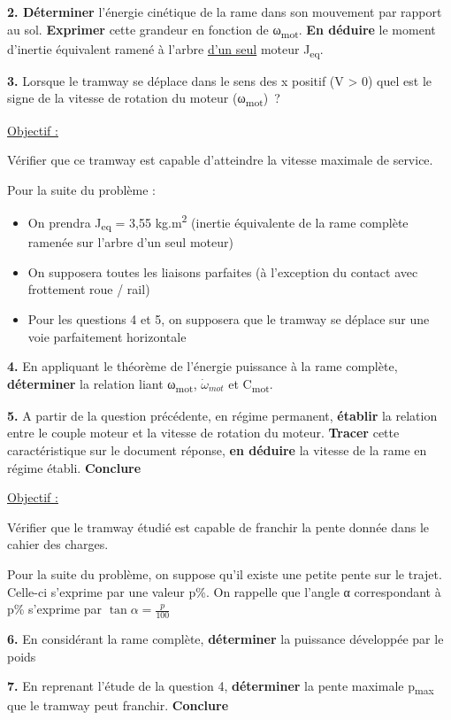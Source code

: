 \textbf{2. Déterminer} l'énergie cinétique de la rame dans son mouvement par rapport au sol. \textbf{Exprimer} cette grandeur en fonction de ω\textsubscript{mot}. \textbf{En déduire} le moment d'inertie équivalent ramené à l'arbre \ul{d'un seul} moteur J\textsubscript{eq}.

\textbf{3.} Lorsque le tramway se déplace dans le sens des x positif (V \textgreater{} 0) quel est le signe de la vitesse de rotation du moteur (ω\textsubscript{mot})~?

\ul{Objectif :}

Vérifier que ce tramway est capable d'atteindre la vitesse maximale de service.

Pour la suite du problème :

\begin{itemize}
\item
  On prendra J\textsubscript{eq} = 3,55 kg.m\textsuperscript{2} (inertie équivalente de la rame complète ramenée sur l'arbre d'un seul moteur)
\item
  On supposera toutes les liaisons parfaites (à l'exception du contact avec frottement roue / rail)
\item
  Pour les questions 4 et 5, on supposera que le tramway se déplace sur une voie parfaitement horizontale
\end{itemize}

\textbf{4.} En appliquant le théorème de l'énergie puissance à la rame complète, \textbf{déterminer} la relation liant ω\textsubscript{mot}, \({\dot{\omega}}_{mot}\) et C\textsubscript{mot}.

\textbf{5.} A partir de la question précédente, en régime permanent, \textbf{établir} la relation entre le couple moteur et la vitesse de rotation du moteur. \textbf{Tracer} cette caractéristique sur le document réponse, \textbf{en déduire} la vitesse de la rame en régime établi. \textbf{Conclure}

\ul{Objectif :}

Vérifier que le tramway étudié est capable de franchir la pente donnée dans le cahier des charges.

Pour la suite du problème, on suppose qu'il existe une petite pente sur le trajet. Celle-ci s'exprime par une valeur p\%. On rappelle que l'angle α correspondant à p\% s'exprime par \(\tan\alpha = \frac{p}{100}\)

\textbf{6.} En considérant la rame complète, \textbf{déterminer} la puissance développée par le poids

\textbf{7.} En reprenant l'étude de la question 4, \textbf{déterminer} la pente maximale p\textsubscript{max} que le tramway peut franchir. \textbf{Conclure}

